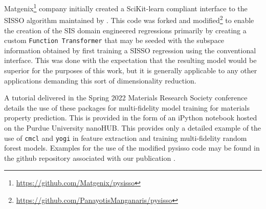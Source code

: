 Matgenix\footnote{\url{https://github.com/Matgenix/pysisso}} company initially created a SciKit-learn compliant interface to the SISSO algorithm maintained by \textcite{ouyang-2018-sisso}.
This code was forked and modified\footnote{\url{https://github.com/PanayotisManganaris/pysisso}} to enable the creation of the SIS domain engineered regressions primarily by creating a custom \texttt{Function Transformer} that may be seeded with the subspace information obtained by first training a SISSO regression using the conventional interface.
This was done with the expectation that the resulting model would be superior for the purposes of this work, but it is generally applicable to any other applications demanding this sort of dimensionality reduction.

A tutorial delivered in the Spring 2022 Materials Research Society conference details the use of these packages for multi-fidelity model training for materials property prediction.
This is provided in the form of an iPython notebook  hosted on the Purdue University nanoHUB.
This provides only a detailed example of the use of \texttt{cmcl} and \texttt{yogi} in feature extraction and training multi-fidelity random forest models.
Examples for the use of the modified pysisso code may be found in the github repository associated with our publication .
